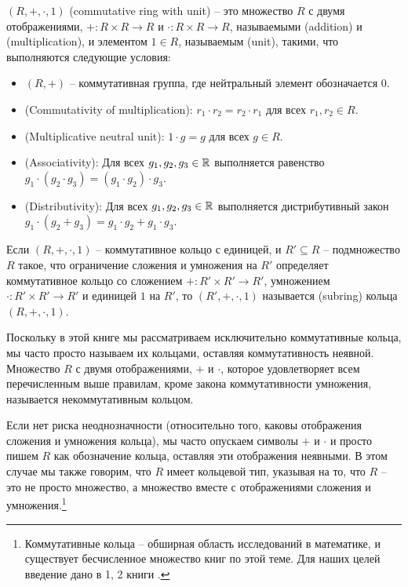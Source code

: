 \begin{definition}\label{def:comm-ring-unit}
 $ (R, +, \cdot, 1) $ (commutative ring with unit) -- это множество $R$ с двумя отображениями, $ +: R \times R \to R $ и $ \cdot: R \times R \to R $, называемыми  (addition) и  (multiplication), и элементом $1\in R$, называемым  (unit), такими, что выполняются следующие условия:
\begin{itemize}
\item $ (R, +) $ -- коммутативная группа, где нейтральный элемент обозначается $ 0 $.
\item {} (Commutativity of multiplication): $r_1\cdot r_2 = r_2\cdot r_1$ для всех $r_1, r_2\in R$.
\item {} (Multiplicative neutral unit): $1\cdot g=g$ для всех $g\in R$.
\item {} (Associativity): Для всех $g_1,g_2,g_3\in\mathbb{R}$ выполняется равенство
$g_1\cdot(g_2\cdot g_3) = (g_1\cdot g_2)\cdot g_3$.
\item {} (Distributivity): Для всех $ g_1, g_2, g_3 \in\mathbb{R} $ выполняется дистрибутивный закон
$ g_1 \cdot \left (g_2 + g_3 \right) = g_1 \cdot g_2 + g_1 \cdot g_3$.
\end{itemize}
Если $(R,+,\cdot,1)$ -- коммутативное кольцо с единицей, и $R'\subseteq R$ -- подмножество $R$ такое, что ограничение сложения и умножения на $R'$ определяет коммутативное кольцо со сложением $+: R'\times R' \to R'$, умножением $\cdot: R'\times R' \to R'$ и единицей $1$ на $R'$, то $(R',+,\cdot,1)$ называется  (subring) кольца $(R,+,\cdot,1)$.
\end{definition}
\begin{notation}Поскольку в этой книге мы рассматриваем исключительно коммутативные кольца, мы часто просто называем их кольцами, оставляя коммутативность неявной.
Множество $R$ с двумя отображениями, $+$ и $\cdot$, которое удовлетворяет всем перечисленным выше правилам, кроме закона коммутативности умножения, называется некоммутативным кольцом. 

Если нет риска неоднозначности (относительно того, каковы отображения сложения и умножения кольца), мы часто опускаем символы $+$ и $\cdot$ и просто пишем $R$ как обозначение кольца, оставляя эти отображения неявными. В этом случае мы также говорим, что $R$ имеет кольцевой тип, указывая на то, что $R$ -- это не просто множество, а множество вместе с отображениями сложения и умножения.\footnote{Коммутативные кольца -- обширная область исследований в математике, и существует бесчисленное множество книг по этой теме. Для наших целей введение дано в \chaptname{} 1, \secname{} 2 книги \cite{nieder-1986}.}
\end{notation}
